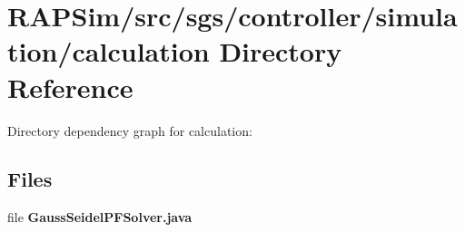 \section{R\-A\-P\-Sim/src/sgs/controller/simulation/calculation Directory Reference}
\label{dir_d8e0ecfa4b71fb9593f1fbdc9c261415}
Directory dependency graph for calculation\-:
\subsection*{Files}
\begin{DoxyCompactItemize}
\item 
file {\bf Gauss\-Seidel\-P\-F\-Solver.\-java}
\end{DoxyCompactItemize}
